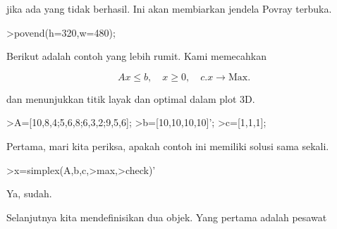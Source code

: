 \documentclass{article}
\begin{document}
\begin{eulernotebook}
\begin{eulercomment}
jika ada yang tidak berhasil. Ini akan membiarkan jendela Povray
terbuka.
\end{eulercomment}
\begin{eulerprompt}
>povend(h=320,w=480);
\end{eulerprompt}
\begin{eulercomment}
Berikut adalah contoh yang lebih rumit. Kami memecahkan

\end{eulercomment}
\begin{eulerformula}
\[
Ax \le b, \quad x \ge 0, \quad c.x \to \text{Max.}
\]
\end{eulerformula}
\begin{eulercomment}
dan menunjukkan titik layak dan optimal dalam plot 3D.
\end{eulercomment}
\begin{eulerprompt}
>A=[10,8,4;5,6,8;6,3,2;9,5,6];
>b=[10,10,10,10]';
>c=[1,1,1];
\end{eulerprompt}
\begin{eulercomment}
Pertama, mari kita periksa, apakah contoh ini memiliki solusi sama
sekali.
\end{eulercomment}
\begin{eulerprompt}
>x=simplex(A,b,c,>max,>check)'
\end{eulerprompt}
\begin{euleroutput}
  [0,  1,  0.5]
\end{euleroutput}
\begin{eulercomment}
Ya, sudah.

Selanjutnya kita mendefinisikan dua objek. Yang pertama adalah pesawat


\end{eulercomment}
\end{eulernotebook}
\end{document}

